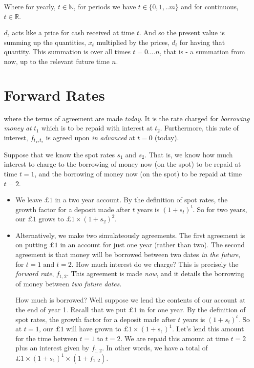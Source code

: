 Where for yearly, $t \in \mathbb{N}$, for periods we have $t \in \{0,1,..m\}$ 
and for continuous, $t \in \mathbb{R}$. 



$d_t$ acts like a price for cash received at time $t$. And so 
the present value is summing up the quantities, $x_t$ multiplied by 
the prices, $d_t$ for having that quantity. This summation is over 
all times $t = 0....n$, that is - a summation from now, up to 
the relevant future time $n$. 



\section{Forward Rates}

where the terms of agreement are made \textit{today}. 
It is the rate charged for \textit{borrowing money at} $t_1$ which is to be repaid 
with interest at $t_2$. Furthermore, this rate of interest, $f_{t_1, t_2}$ is 
agreed upon \textit{in advanced} at $t = 0$ (today). 


\frmrule

\begin{example}
Suppose that we know the spot rates $s_1$ and $s_2$. That is, 
we know how much interest to charge to the borrowing of money 
now (on the spot) to be repaid at time $t = 1$, 
and the borrowing of money now (on the spot) to be repaid at time $t = 2$. 
\begin{itemize}
\item We leave $\pounds 1$ in a two year account. By the definition of spot rates, 
the growth factor for a deposit made after $t$ years is $(1 + s_t)^t$.
So for two years, our  $\pounds 1$ grows to $\pounds 1 \times (1 + s_2)^2$. 
\item Alternatively, we make two simulateously agreements. The first agreement 
is on putting $\pounds 1$ in an account for just one year (rather than two). 
The second agreement is 
that money will be borrowed between two dates \textit{in the future},
for $t = 1$ and $t = 2$. How much interest do we charge? This is precisely the \textit{forward rate}, 
$f_{1,2}$. This agreement is made \textit{now}, and it details the borrowing of money 
between \textit{two future dates}.

How much is borrowed? Well suppose we lend the contents of our account 
at the end of year 1. Recall that we put  $\pounds 1$ in for one year.
By the definition of spot rates, 
the growth factor for a deposit made after $t$ years is $(1 + s_t)^t$.
So at $t = 1$, our  $\pounds 1$ will have grown to $\pounds 1 \times (1 + s_1)^1$.
Let's lend this amount for the time between $t = 1$ to $t = 2$. We are repaid 
this amount at time $t = 2$ plus an interest given by $f_{1,2}$. In other words, we 
have a total of $\pounds 1 \times (1 + s_1)^1 \times (1 + f_{1,2})$. 
\end{itemize}
\end{example}

